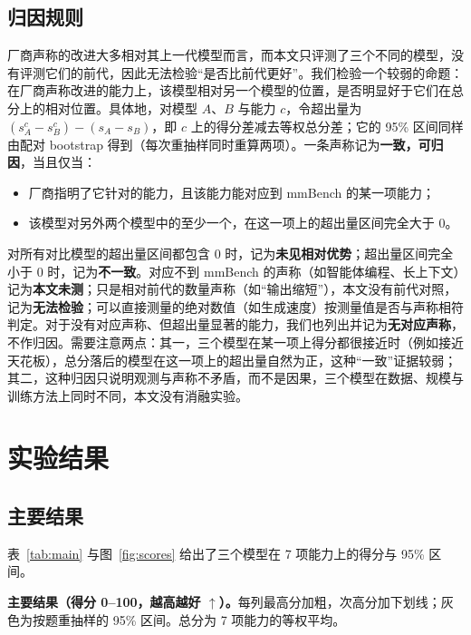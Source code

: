 \documentclass[11pt,a4paper,fontset=none]{ctexart}
\begin{document}
\subsection{归因规则}
\label{sec:attr-rule}

厂商声称的改进大多相对其上一代模型而言，而本文只评测了三个不同的模型，没有评测它们的前代，因此无法检验“是否比前代更好”。我们检验一个较弱的命题：在厂商声称改进的能力上，该模型相对另一个模型的位置，是否明显好于它们在总分上的相对位置。具体地，对模型 $A$、$B$ 与能力 $c$，令超出量为 $(s_A^c - s_B^c) - (s_A - s_B)$，即 $c$ 上的得分差减去等权总分差；它的 95\% 区间同样由配对 bootstrap 得到（每次重抽样同时重算两项）。一条声称记为\textbf{一致，可归因}，当且仅当：
\begin{itemize}[leftmargin=1.6em]
  \item 厂商指明了它针对的能力，且该能力能对应到 mmBench 的某一项能力；
  \item 该模型对另外两个模型中的至少一个，在这一项上的超出量区间完全大于 0。
\end{itemize}
对所有对比模型的超出量区间都包含 0 时，记为\textbf{未见相对优势}；超出量区间完全小于 0 时，记为\textbf{不一致}。对应不到 mmBench 的声称（如智能体编程、长上下文）记为\textbf{本文未测}；只是相对前代的数量声称（如“输出缩短”），本文没有前代对照，记为\textbf{无法检验}；可以直接测量的绝对数值（如生成速度）按测量值是否与声称相符判定。对于没有对应声称、但超出量显著的能力，我们也列出并记为\textbf{无对应声称}，不作归因。需要注意两点：其一，三个模型在某一项上得分都很接近时（例如接近天花板），总分落后的模型在这一项上的超出量自然为正，这种“一致”证据较弱；其二，这种归因只说明观测与声称不矛盾，而不是因果，三个模型在数据、规模与训练方法上同时不同，本文没有消融实验。

\section{实验结果}

\subsection{主要结果}

表~\ref{tab:main} 与图~\ref{fig:scores} 给出了三个模型在 7 项能力上的得分与 95\% 区间。

\begin{table}[t]
  \centering
  \caption{\textbf{主要结果（得分 0--100，越高越好 $\uparrow$）。}每列最高分加粗，次高分加下划线；灰色为按题重抽样的 95\% 区间。总分为 7 项能力的等权平均。}
  \label{tab:main}
  \small
  \setlength{\tabcolsep}{4.2pt}
  \begin{adjustbox}{max width=\linewidth}\end{adjustbox}
\end{table}
\end{document}
